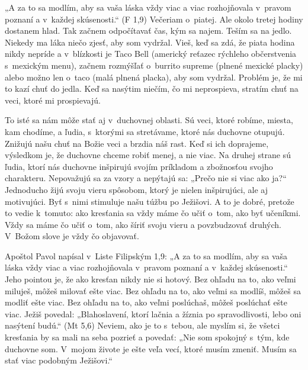 \def\velkostpisma{10}
\def\velkostriadku{12.5}



„A za to sa modlím, aby sa vaša láska vždy viac a viac rozhojňovala v~pravom poznaní a v~každej skúsenosti.“ (F 1,9)
Večeriam o~piatej. Ale okolo tretej hodiny dostanem hlad. Tak začnem odpočítavať čas, kým sa najem. Teším sa na jedlo. Niekedy ma láka niečo zjesť, aby som vydržal. Vieš, keď sa zdá, že piata hodina nikdy nepríde a v~blízkosti je Taco Bell (americký reťazec rýchleho občerstvenia s~mexickým menu), začnem rozmýšľať o~burrito supreme (plnené mexické placky) alebo možno len o~taco (malá plnená placka), aby som vydržal.
Problém je, že mi to kazí chuť do jedla. Keď sa nasýtim niečím, čo mi neprospieva, stratím chuť na veci, ktoré mi prospievajú.

To isté sa nám môže stať aj v~duchovnej oblasti. Sú veci, ktoré robíme, miesta, kam chodíme, a ľudia, s~ktorými sa stretávame, ktoré nás duchovne otupujú. Znižujú našu chuť na Božie veci a brzdia náš rast. Keď si ich doprajeme, výsledkom je, že duchovne chceme robiť menej, a nie viac.
Na druhej strane sú ľudia, ktorí nás duchovne inšpirujú svojím príkladom a zbožnosťou svojho charakteru. Nepovažujú sa za vzory a nepýtajú sa: „Prečo nie si viac ako ja?“ Jednoducho žijú svoju vieru spôsobom, ktorý je nielen inšpirujúci, ale aj motivujúci. Byť s~nimi stimuluje našu túžbu po Ježišovi.
A to je dobré, pretože to vedie k~tomuto: ako kresťania sa vždy máme čo učiť o~tom, ako byť učeníkmi. Vždy sa máme čo učiť o~tom, ako šíriť svoju vieru a povzbudzovať druhých. V~Božom slove je vždy čo objavovať.

Apoštol Pavol napísal v~Liste Filipským 1,9: „A za to sa modlím, aby sa vaša láska vždy viac a viac rozhojňovala v~pravom poznaní a v~každej skúsenosti.“ Jeho pointou je, že ako kresťan nikdy nie si hotový. Bez ohľadu na to, ako veľmi miluješ, môžeš milovať ešte viac. Bez ohľadu na to, ako veľmi sa modlíš, môžeš sa modliť ešte viac. Bez ohľadu na to, ako veľmi poslúchaš, môžeš poslúchať ešte viac.
Ježiš povedal: „Blahoslavení, ktorí lačnia a žíznia po spravodlivosti, lebo oni nasýtení budú.“ (Mt 5,6) Neviem, ako je to s~tebou, ale myslím si, že všetci kresťania by sa mali na seba pozrieť a povedať: „Nie som spokojný s~tým, kde duchovne som. V~mojom živote je ešte veľa vecí, ktoré musím zmeniť. Musím sa stať viac podobným Ježišovi.“

